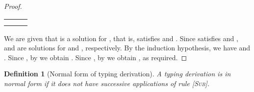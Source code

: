\documentclass{eptcs}
\newcommand{\ih}{induction hypothesis\xspace}
\newcommand{\Sub}{{\small \textsc{Sub}}}
\newtheorem{defn}[thm]{Definition}
\begin{document}
\begin{proof}
\begin{flushleft}
\begin{tabular}{lll}
                                &                         
                                &                                         \\
                                
                                & &   \\ 
\end{tabular}
\end{flushleft}

We are given that  is a solution for , that
is,  satisfies  and
. Since  satisfies  and ,
 and  are solutions for
 and , respectively.
By the \ih, we have  and
. Since , by  we obtain
. Since , by
 we obtain , as required.
\end{proof}

\begin{defn}[Normal form of typing derivation]
A typing derivation is in {\em normal form} if it does not have successive
applications of rule \textsc{[\Sub]}.
\end{defn}
\end{document}
